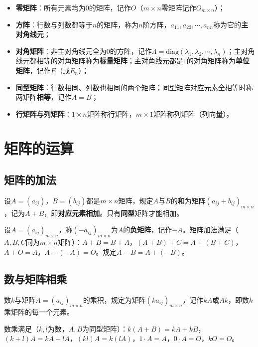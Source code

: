 \begin{itemize}
\item \textbf{零矩阵}：所有元素均为$0$的矩阵，记作$O$（$m\times n$零矩阵记作$O_{m\times n}$）；
\item \textbf{方阵}：行数与列数都等于$n$的矩阵，称为$n$阶方阵，$a_{11},a_{22},\cdots,a_{nn}$称为它的\textbf{主对角线元}；
\item \textbf{对角矩阵}：非主对角线元全为$0$的方阵，记作$\Lambda=\mathrm{diag}(\lambda_1,\lambda_2,\cdots,\lambda_n)$；主对角线元都相等的对角矩阵称为\textbf{标量矩阵}；主对角线元都是$1$的对角矩阵称为\textbf{单位矩阵}，记作$E$（或$E_n$）；
\item \textbf{同型矩阵}：行数相同、列数也相同的两个矩阵；同型矩阵对应元素全相等时称两矩阵\textbf{相等}，记作$A=B$；
\item \textbf{行矩阵与列矩阵}：$1\times n$矩阵称行矩阵，$m\times 1$矩阵称列矩阵（列向量）。
\end{itemize}

\section{矩阵的运算}

\subsection{矩阵的加法}

\begin{definition}
设$A=(a_{ij})$，$B=(b_{ij})$都是$m\times n$矩阵，规定$A$与$B$的\textbf{和}为矩阵$(a_{ij}+b_{ij})_{m\times n}$，记为$A+B$，即\textbf{对应元素相加}。只有\textbf{同型}矩阵才能相加。
\end{definition}

设$A=(a_{ij})_{m\times n}$，称$(-a_{ij})_{m\times n}$为$A$的\textbf{负矩阵}，记作$-A$。矩阵加法满足（$A,B,C$同为$m\times n$矩阵）：$A+B=B+A$，$(A+B)+C=A+(B+C)$，$A+O=A$，$A+(-A)=O$。规定$A-B=A+(-B)$。

\subsection{数与矩阵相乘}

\begin{definition}
数$k$与矩阵$A=(a_{ij})_{m\times n}$的乘积，规定为矩阵$(ka_{ij})_{m\times n}$，记作$kA$或$Ak$，即数$k$乘矩阵的每一个元素。
\end{definition}

数乘满足（$k,l$为数，$A,B$为同型矩阵）：$k(A+B)=kA+kB$，$(k+l)A=kA+lA$，$(kl)A=k(lA)$，$1\cdot A=A$，$0\cdot A=O$，$kO=O$。

